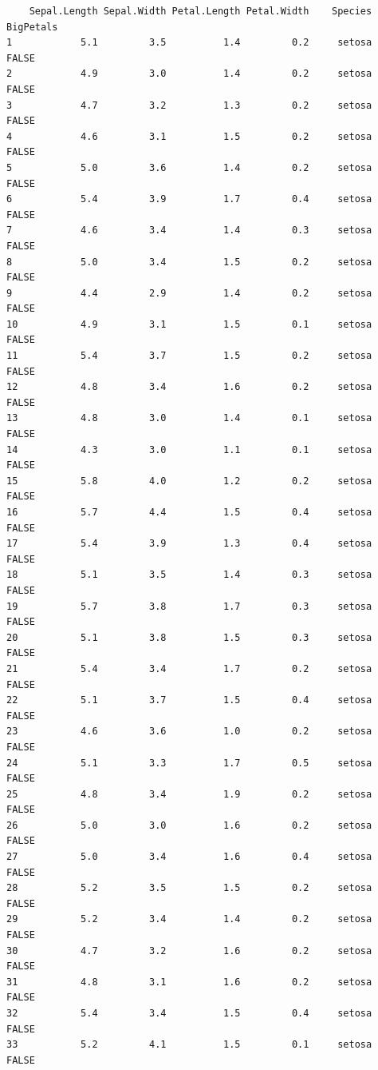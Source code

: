 \documentclass[
  letterpaper,
  DIV=11,
  numbers=noendperiod]{scrreprt}
\begin{document}
\begin{verbatim}
    Sepal.Length Sepal.Width Petal.Length Petal.Width    Species BigPetals
1            5.1         3.5          1.4         0.2     setosa     FALSE
2            4.9         3.0          1.4         0.2     setosa     FALSE
3            4.7         3.2          1.3         0.2     setosa     FALSE
4            4.6         3.1          1.5         0.2     setosa     FALSE
5            5.0         3.6          1.4         0.2     setosa     FALSE
6            5.4         3.9          1.7         0.4     setosa     FALSE
7            4.6         3.4          1.4         0.3     setosa     FALSE
8            5.0         3.4          1.5         0.2     setosa     FALSE
9            4.4         2.9          1.4         0.2     setosa     FALSE
10           4.9         3.1          1.5         0.1     setosa     FALSE
11           5.4         3.7          1.5         0.2     setosa     FALSE
12           4.8         3.4          1.6         0.2     setosa     FALSE
13           4.8         3.0          1.4         0.1     setosa     FALSE
14           4.3         3.0          1.1         0.1     setosa     FALSE
15           5.8         4.0          1.2         0.2     setosa     FALSE
16           5.7         4.4          1.5         0.4     setosa     FALSE
17           5.4         3.9          1.3         0.4     setosa     FALSE
18           5.1         3.5          1.4         0.3     setosa     FALSE
19           5.7         3.8          1.7         0.3     setosa     FALSE
20           5.1         3.8          1.5         0.3     setosa     FALSE
21           5.4         3.4          1.7         0.2     setosa     FALSE
22           5.1         3.7          1.5         0.4     setosa     FALSE
23           4.6         3.6          1.0         0.2     setosa     FALSE
24           5.1         3.3          1.7         0.5     setosa     FALSE
25           4.8         3.4          1.9         0.2     setosa     FALSE
26           5.0         3.0          1.6         0.2     setosa     FALSE
27           5.0         3.4          1.6         0.4     setosa     FALSE
28           5.2         3.5          1.5         0.2     setosa     FALSE
29           5.2         3.4          1.4         0.2     setosa     FALSE
30           4.7         3.2          1.6         0.2     setosa     FALSE
31           4.8         3.1          1.6         0.2     setosa     FALSE
32           5.4         3.4          1.5         0.4     setosa     FALSE
33           5.2         4.1          1.5         0.1     setosa     FALSE

\end{verbatim}
\end{document}

